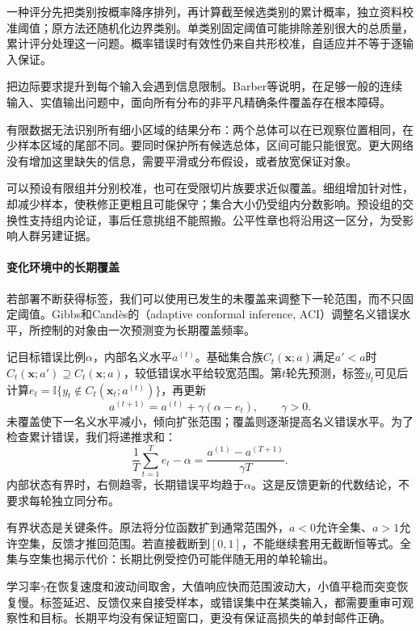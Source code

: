 一种评分先把类别按概率降序排列，再计算截至候选类别的累计概率，独立资料校准阈值；原方法还随机化边界类别。单类别固定阈值可能排除差别很大的总质量，累计评分处理这一问题。概率错误时有效性仍来自共形校准，自适应并不等于逐输入保证。

把边际要求提升到每个输入会遇到信息限制。Barber等说明，在足够一般的连续输入、实值输出问题中，面向所有分布的非平凡精确条件覆盖存在根本障碍。

有限数据无法识别所有细小区域的结果分布：两个总体可以在已观察位置相同，在少样本区域的尾部不同。要同时保护所有候选总体，区间可能只能很宽。更大网络没有增加这里缺失的信息，需要平滑或分布假设，或者放宽保证对象。

可以预设有限组并分别校准，也可在受限切片族要求近似覆盖。细组增加针对性，却减少样本，使秩修正更粗且可能保守；集合大小仍受组内分数影响。预设组的交换性支持组内论证，事后任意挑组不能照搬。公平性章也将沿用这一区分，为受影响人群另建证据。

\paragraph{变化环境中的长期覆盖}

若部署不断获得标签，我们可以使用已发生的未覆盖来调整下一轮范围，而不只固定阈值。Gibbs和Candès的（adaptive conformal inference, ACI）调整名义错误水平，所控制的对象由一次预测变为长期覆盖频率。

记目标错误比例$\alpha$，内部名义水平$a^{(t)}$。基础集合族$C_t(\bm{x};a)$满足$a'<a$时$C_t(\bm{x};a')\supseteq C_t(\bm{x};a)$，较低错误水平给较宽范围。第$t$轮先预测，标签$y_t$可见后计算$e_t=\mathbb I\{y_t\notin C_t(\bm{x}_t;a^{(t)})\}$，再更新
\begin{equation}
 a^{(t+1)}=a^{(t)}+\gamma(\alpha-e_t),
 \qquad \gamma>0.
 \label{eq:reliability-aci}
\end{equation}
未覆盖使下一名义水平减小，倾向扩张范围；覆盖则逐渐提高名义错误水平。为了检查累计错误，我们将递推求和：
\[
 \frac1T\sum_{t=1}^{T}e_t-\alpha
 =\frac{a^{(1)}-a^{(T+1)}}{\gamma T}.
\]
内部状态有界时，右侧趋零，长期错误平均趋于$\alpha$。这是反馈更新的代数结论，不要求每轮独立同分布。

有界状态是关键条件。原法将分位函数扩到通常范围外，$a<0$允许全集、$a>1$允许空集，反馈才推回范围。若直接截断到$[0,1]$，不能继续套用无截断恒等式。全集与空集也揭示代价：长期比例受控仍可能伴随无用的单轮输出。

学习率$\gamma$在恢复速度和波动间取舍，大值响应快而范围波动大，小值平稳而突变恢复慢。标签延迟、反馈仅来自接受样本，或错误集中在某类输入，都需要重审可观察性和目标。长期平均没有保证短窗口，更没有保证高损失的单封邮件正确。


